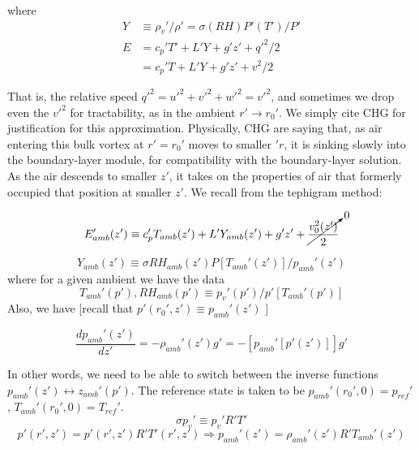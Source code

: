 \documentclass[preprint, prX]{revtex4}
\newcommand{\dd}[2]{\frac{d#1}{d#2}}
\begin{document}
\begin{itemize}
where 
\begin{equation}
\begin{split}
	Y &\equiv \rho_v' / \rho' = \sigma(RH) P'(T')/ P' \\
	E &= c_p' T' + L' Y + g'z' + q'^2 /2 \\
	&= c_p' T + L'Y + g'z' + v^2 / 2
\end{split}
\end{equation}

That is, the relative speed $q'^2 = u'^2 + v'^2 + w'^2 = v'^2$, and sometimes we drop even the $v'^2$ for tractability, as in the ambient $r' \to r_0'$. We simply cite CHG for justification for this approximation. Physically, CHG are saying that, as air entering this bulk vortex at $r' = r_0'$ moves to smaller $'r$, it is sinking slowly into the boundary-layer module, for compatibility with the boundary-layer solution. As the air descends to smaller $z'$, it takes on the properties of air that formerly occupied that position at smaller $z'$. We recall from the tephigram method:

\begin{equation}
	E_{amb}'(z') \equiv c_p' T_{amb}(z') + L' Y_{amb}(z') + g' z' + \cancelto{0}{\frac{v_0^2(z')}{2}}
\end{equation}

\begin{equation}
	Y_{amb}(z') \equiv \sigma RH_{amb}(z') P[T_{amb}'(z')] / p_{amb}'(z')
\end{equation}
where for a given ambient we have the data
\begin{equation}
	T_{amb}'(p'), RH_{amb}(p') \equiv p_v'(p')/p'[T_{amb}'(p')]
\end{equation}
Also, we have [recall that $p'(r_0', z') \equiv p_{amb}'(z')$ ]

\begin{equation}
	\dd{p_{amb}'(z')}{z'} = -\rho_{amb}'(z') g' = -[p_{amb}'[p'(z')]]g'
\end{equation}

In other words, we need to be able to switch between the inverse functions $p_{amb}'(z') \leftrightarrow z_{amb}'(p')$. The reference state is taken to be $p_{amb}'(r_0', 0) = p_{ref}'$, $T_{amb}'(r_0', 0) = T_{ref}'$.
\begin{equation}
	\sigma p_v' \equiv p_v' R' T'
\end{equation}
\begin{equation}
	p'(r',z') = p'(r',z')R'T'(r',z') \Rightarrow p_{amb}'(z') = \rho_{amb}'(z') R'T_{amb}'(z')
\end{equation}


\end{itemize}
\end{document}
